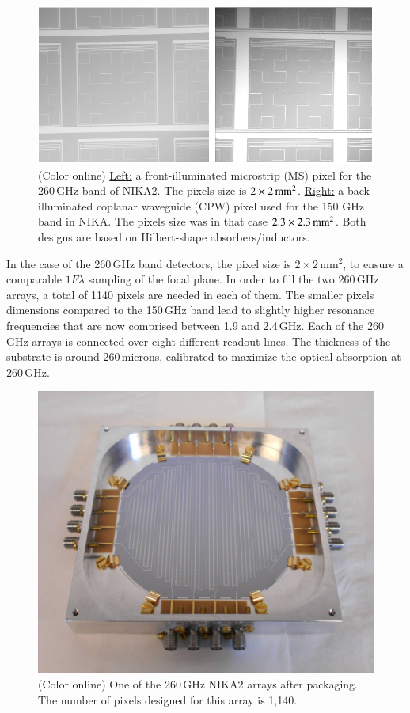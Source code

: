 \documentclass[]{aa} %
\begin{document}
\begin{figure}[h]
   \centering
    \includegraphics[width=.95\linewidth]{CPWeMS.png}
      \caption{(Color online) \underline{Left:} a front-illuminated microstrip (MS) pixel for the 260\,GHz band of NIKA2. The pixels size is $2\times2\textrm{\,mm}^2$. \underline{Right:} a back-illuminated coplanar waveguide (CPW) pixel used for the 150 GHz band in NIKA. The pixels size was in that case $2.3\times2.3\textrm{\,mm}^2$. Both designs are based on Hilbert-shape absorbers/inductors.}
         \label{Pixels}
\end{figure}

In the case of the 260\,GHz band detectors, the pixel size is $2\times
2\mathrm{\,mm}^2$, to ensure a comparable $1 F \lambda$ sampling of the focal
plane. In order to fill the two 260\,GHz arrays, a total of 1140 pixels are
needed in each of them. The smaller pixels dimensions compared to the 150\,GHz
band lead to slightly higher resonance frequencies that are now comprised
between 1.9 and 2.4\,GHz. Each of the 260\,GHz arrays is connected over eight
different readout lines. The thickness of the substrate is around 260\,microns,
calibrated to maximize the optical absorption at 260\,GHz.

\begin{figure}[h]
   \centering
    \includegraphics[width=.95\linewidth]{1mm_array.jpg}
      \caption{(Color online) One of the 260\,GHz NIKA2 arrays after packaging. The number of pixels designed for this array is 1,140.}
         \label{Array}
\end{figure}
\end{document}
